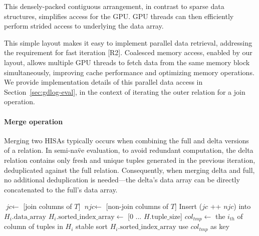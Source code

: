 \documentclass[nonacm,sigplan]{acmart}
\newcommand{\revised}[1]{{#1}}
\begin{document}
This densely-packed contiguous arrangement, in contrast to sparse data structures, simplifies access for the GPU. GPU threads can then efficiently perform strided access to underlying the data array.

This simple layout makes it easy to implement parallel data retrieval, addressing the requirement for fast iteration [R2]. 
Coalesced memory access, enabled by our layout, allows multiple GPU threads to fetch data from the same memory block simultaneously, improving cache performance and optimizing memory operations. We provide implementation details of this parallel data access in Section~\ref{sec:gdlog-eval}, in the context of iterating the outer relation for a join operation.

\paragraph*{Merge operation}
\revised{Merging two HISAs typically occurs when combining the full and delta versions of a relation. In semi-na\"ve evaluation, to avoid redundant computation, the delta relation contains only fresh and unique tuples generated in the previous iteration, deduplicated against the full relation. Consequently, when merging delta and full, no additional deduplication is needed—the delta’s data array can be directly concatenated to the full’s data array.}

\begin{algorithm}[t]
\caption{Construction of Sorted Index Array $H_i$ for Relation $H$}
\label{alg:index-construct}
\begin{algorithmic}[1]
    \State $\textit{jc} \gets $ [join columns of $T$]
    \State $\textit{njc} \gets $ [non-join columns of $T$]
    \State Insert ($\textit{jc}$ ++ $\textit{njc}$) into $H_{i}.\text{data\_array}$
\EndFor
\State $H_{i}.\text{sorted\_index\_array} \gets $ [0 ... $H.\text{tuple\_size}$]
    \State $col_{tmp} \gets$ the $i_{th}$ of column of tuples in $H_i$
    \State stable sort $H_{i}.\text{sorted\_index\_array}$ use $col_{tmp}$ as key
\EndFor
\end{algorithmic}
\end{algorithm}
\end{document}
